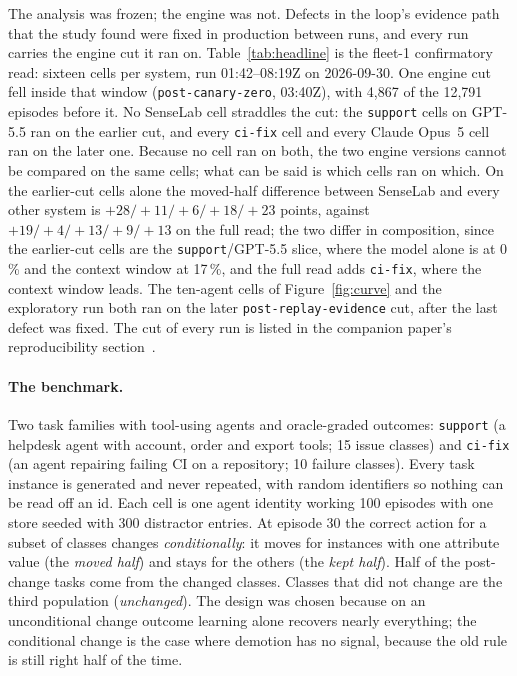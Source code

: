 \documentclass[11pt]{article}
\newcommand{\code}[1]{\texttt{#1}}
\begin{document}
The analysis was frozen; the engine was not. Defects in the loop's evidence path that the study
found were fixed in production between runs, and every run carries the engine cut it ran on.
Table~\ref{tab:headline} is the fleet-1 confirmatory read: sixteen cells per system, run
01:42--08:19Z on 2026-09-30. One engine cut fell inside that window (\code{post-canary-zero},
03:40Z), with 4,867 of the 12,791 episodes before it. No SenseLab cell straddles the cut: the
\code{support} cells on GPT-5.5 ran on the earlier cut, and every \code{ci-fix} cell and every
Claude Opus~5 cell ran on the later one. Because no cell ran on both, the two engine versions
cannot be compared on the same cells; what can be said is which cells ran on which. On the
earlier-cut cells alone the moved-half difference between SenseLab and every other system is
$+28/{+}11/{+}6/{+}18/{+}23$ points, against $+19/{+}4/{+}13/{+}9/{+}13$ on the full read; the
two differ in composition, since the earlier-cut cells are the \code{support}/GPT-5.5 slice,
where the model alone is at 0\,\% and the context window at 17\,\%, and the full read adds
\code{ci-fix}, where the context window leads. The ten-agent cells of Figure~\ref{fig:curve} and the
exploratory run both ran on the later \code{post-replay-evidence} cut, after the last defect
was fixed. The cut of every run is listed in the companion paper's reproducibility
section~\cite{rsi-paper}.

\paragraph{The benchmark.} Two task families with tool-using agents and oracle-graded outcomes:
\code{support} (a helpdesk agent with account, order and export tools; 15 issue classes) and
\code{ci-fix} (an agent repairing failing CI on a repository; 10 failure classes). Every task
instance is generated and never repeated, with random identifiers so nothing can be read off an
id. Each cell is one agent identity working 100 episodes with one store seeded with 300
distractor entries. At episode 30 the correct action for a subset of classes changes
\emph{conditionally}: it moves for instances with one attribute value (the \emph{moved half})
and stays for the others (the \emph{kept half}). Half of the post-change tasks come from the
changed classes. Classes that did not change are the third population (\emph{unchanged}). The
design was chosen because on an unconditional change outcome learning alone recovers nearly
everything; the conditional change is the case where demotion has no signal, because the old
rule is still right half of the time.
\end{document}
